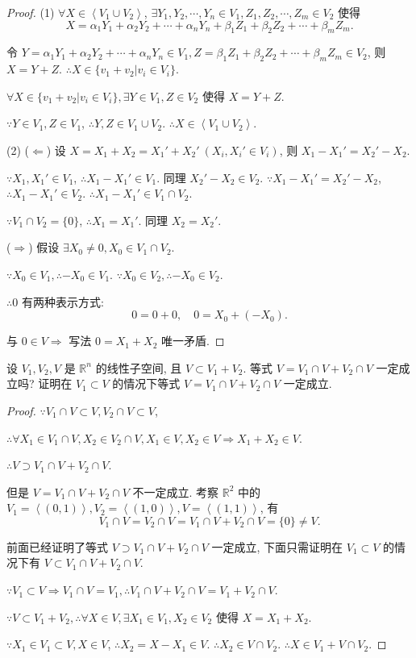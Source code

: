 \documentclass[color=black,device=normal,lang=cn,mode=geye]{elegantnote}
\begin{document}
\begin{proof}
    (1) $\forall X\in\left<V_1\cup V_2\right>$, $\exists Y_1,Y_2,\cdots,Y_n\in V_1,Z_1,Z_2,\cdots,Z_m\in V_2$ 使得
    \[X=\alpha_1Y_1+\alpha_2Y_2+\cdots+\alpha_nY_n+\beta_1Z_1+\beta_2Z_2+\cdots+\beta_mZ_m.\]

    令 $Y=\alpha_1Y_1+\alpha_2Y_2+\cdots+\alpha_nY_n\in V_1,Z=\beta_1Z_1+\beta_2Z_2+\cdots+\beta_mZ_m\in V_2$, 则 $X=Y+Z$. $\therefore X\in\{v_1+v_2|v_i\in V_i\}$.

    $\forall X\in\{v_1+v_2|v_i\in V_i\},\exists Y\in V_1,Z\in V_2$ 使得 $X=Y+Z$.

    $\because Y\in V_1,Z\in V_1$, $\therefore Y,Z\in V_1\cup V_2$. $\therefore X\in\left<V_1\cup V_2\right>$.
    
    (2) ($\Leftarrow$) 设 $X=X_1+X_2=X_1'+X_2'\ (X_i,X_i'\in V_i)$, 则 $X_1-X_1'=X_2'-X_2$.

    $\because X_1,X_1'\in V_1$, $\therefore X_1-X_1'\in V_1$. 同理 $X_2'-X_2\in V_2$. $\because X_1-X_1'=X_2'-X_2$, $\therefore X_1-X_1'\in V_2$. $\therefore X_1-X_1'\in V_1\cap V_2$.

    $\because V_1\cap V_2=\{0\}$, $\therefore X_1=X_1'$. 同理 $X_2=X_2'$.

    ($\Rightarrow$) 假设 $\exists X_0\neq0,X_0\in V_1\cap V_2$.

    $\because X_0\in V_1,\therefore-X_0\in V_1$. $\because X_0\in V_2,\therefore-X_0\in V_2$.

    $\therefore0$ 有两种表示方式:
    \[0=0+0,\quad0=X_0+(-X_0).\]

    与 $0\in V\Rightarrow$ 写法 $0=X_1+X_2$ 唯一矛盾.
\end{proof}
\begin{exercise}%
    设 $V_1,V_2,V$ 是 $\mathbb{R}^n$ 的线性子空间, 且 $V\subset V_1+V_2$. 等式 $V=V_1\cap V+V_2\cap V$ 一定成立吗? 证明在 $V_1\subset V$ 的情况下等式 $V=V_1\cap V+V_2\cap V$ 一定成立.
\end{exercise}
\begin{proof}
    $\because V_1\cap V\subset V,V_2\cap V\subset V$,

    $\therefore\forall X_1\in V_1\cap V,X_2\in V_2\cap V,X_1\in V,X_2\in V\Rightarrow X_1+X_2\in V$.

    $\therefore V\supset V_1\cap V+V_2\cap V$.

    但是 $V=V_1\cap V+V_2\cap V$ 不一定成立. 考察 $\mathbb{R}^2$ 中的 $V_1=\left<(0,1)\right>,V_2=\left<(1,0)\right>,V=\left<(1,1)\right>$, 有
    \[V_1\cap V=V_2\cap V=V_1\cap V+V_2\cap V=\{0\}\neq V.\]

    前面已经证明了等式 $V\supset V_1\cap V+V_2\cap V$ 一定成立, 下面只需证明在 $V_1\subset V$ 的情况下有 $V\subset V_1\cap V+V_2\cap V$.

    $\because V_1\subset V\Rightarrow V_1\cap V=V_1,\therefore V_1\cap V+V_2\cap V=V_1+V_2\cap V$.

    $\because V\subset V_1+V_2,\therefore\forall X\in V,\exists X_1\in V_1,X_2\in V_2$ 使得 $X=X_1+X_2$.

    $\because X_1\in V_1\subset V,X\in V$, $\therefore X_2=X-X_1\in V$. $\therefore X_2\in V\cap V_2$. $\therefore X\in V_1+V\cap V_2$.
\end{proof}
\end{document}
